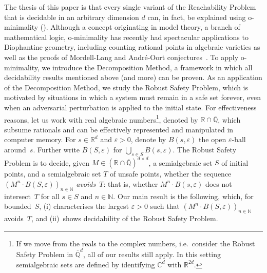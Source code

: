 \documentclass[a4paper,UKenglish,cleveref]{lipics-v2021}
\newcommand{\nat}{\mathbb{N}}
\newcommand{\rel}{\mathbb{R}}
\newcommand{\rat}{\mathbb{Q}}
\newcommand{\com}{\mathbb{C}}
\newcommand{\alg}{\overline{\rat}}
\newcommand{\ralg}{\rel \cap \alg}
\begin{document}
The thesis of this paper is that every single variant of the Reachability Problem that is decidable in an arbitrary dimension $d$ can, in fact, be explained using o-minimality ().
Although a concept originating in model theory, a branch of mathematical logic, o-minimality has recently had spectacular applications to Diophantine geometry, including counting rational points in algebraic varieties as well as the proofs of Mordell-Lang and André-Oort conjectures~\cite{pila2014minimality}.
To apply o-minimality, we introduce the Decomposition Method, a framework in which all decidability results mentioned above (and more) 
can be proven.
As an application of the Decomposition Method, we study the Robust Safety Problem, which is motivated by situations in which a system must remain in a safe set forever, even when an adversarial perturbation is applied to the initial state.
For effectiveness reasons, let us work with real algebraic numbers\footnote{If we move from the reals to the complex numbers, i.e.\ consider the Robust Safety Problem in $\alg^d$, all of our results still apply. In this setting semialgebraic sets are defined by identifying $\com^d$ with $\rel^{2d}$.}, denoted by $\ralg$, which subsume rationals and can be effectively represented and manipulated in computer memory.
For $s \in \rel^d$ and $\varepsilon > 0$, denote by $B(s, \varepsilon)$ the open $\varepsilon$-ball around~$s$.
Further write  $B(S,\varepsilon)$ for $\bigcup_{s \in S} B(s,\varepsilon)$.
The Robust Safety Problem is to decide, given $M \in (\ralg)^{d\times d}$, a semialgebraic set $S$ of initial points, and a semialgebraic set $T$ of unsafe points, whether the sequence $(M^n \cdot B(S,\varepsilon))_{n\in\nat}$ \emph{avoids}~$T$: that is, whether $M^n \cdot B(s,\varepsilon)$ does not intersect~$T$ for all $s \in S$ and $n \in \nat$.
Our main result is the following, which, for bounded~$S$, (i) characterises the largest $\varepsilon > 0$ such that $(M^n \cdot B(S,\varepsilon))_{n\in\nat}$ avoids~$T$, and (ii)~shows decidability of the Robust Safety Problem.
\end{document}
